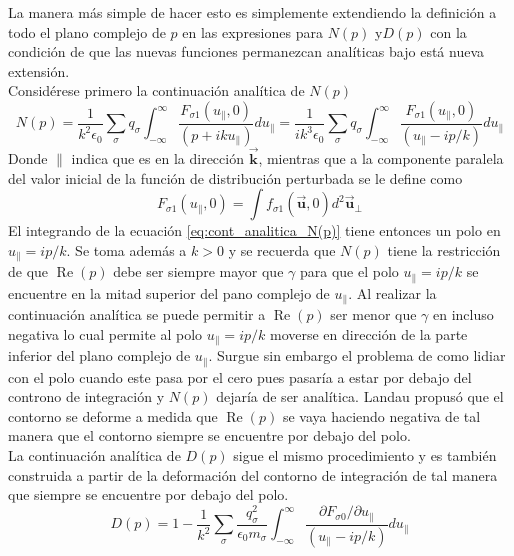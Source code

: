 \documentclass[../tesis_main_file.tex]{subfiles}
\begin{document}
La manera más simple de hacer esto es simplemente extendiendo la definición a todo el plano complejo de $p$ en las expresiones para $N(p)$ y$D(p)$ con la condición de que las nuevas funciones permanezcan analíticas bajo está nueva extensión.\\
Considérese primero la continuación analítica de $N(p)$
\begin{equation}
\label{eq:cont_analitica_N(p)}
N(p) = \frac{1}{k^2 \epsilon_0}\sum_{\sigma}q_{\sigma}\int ^{\infty}_{-\infty}\frac{F_{\sigma 1}(u_{\parallel},0)}{(p +iku_{\parallel})}du_{\parallel}=\frac{1}{ik^3 \epsilon_0}\sum_{\sigma}q_{\sigma}\int ^{\infty}_{-\infty}\frac{F_{\sigma 1}(u_{\parallel},0)}{(u_{\parallel} -ip/k)}du_{\parallel}
\end{equation}
Donde $\parallel$ indica que es en la dirección $\overrightarrow{\textbf{k}}$, mientras que a la componente paralela del valor inicial de la función de distribución perturbada se le define como
\begin{equation}
F_{\sigma 1}(u_{\parallel},0)=\int f_{\sigma 1}(\overrightarrow{\textbf{u}},0)d^2\overrightarrow{\textbf{u}}_{\perp}
\end{equation}
El integrando de la ecuación \ref{eq:cont_analitica_N(p)} tiene entonces un polo en $u_{\parallel}=ip/k$. Se toma además a $k>0$ y se recuerda que $N(p)$ tiene la restricción de que $\operatorname{Re}(p)$ debe ser siempre mayor que $\gamma$ para que el polo $u_{\parallel}=ip/k$ se encuentre en la mitad superior del pano complejo de $u_{\parallel}$. Al realizar la continuación analítica se puede permitir a $\operatorname{Re}(p)$ ser menor que $\gamma$ en incluso negativa lo cual permite al polo $u_{\parallel}=ip/k$ moverse en dirección de la parte inferior del plano complejo de $u_{\parallel}$. Surgue sin embargo el problema de como lidiar con el polo cuando este pasa por el cero pues pasaría a estar por debajo del controno de integración y $N(p)$ dejaría de ser analítica. Landau propusó que el contorno se deforme a medida que $\operatorname{Re}(p)$ se vaya haciendo negativa de tal manera que el contorno siempre se encuentre por debajo del polo.\cite{bellan2008fundamentals}\\
La continuación analítica de $D(p)$ sigue el mismo procedimiento y es también construida a partir de la deformación del contorno de integración de tal manera que siempre se encuentre por debajo del polo.\\
\begin{equation}
\label{eq:cont_analitica_D(p)}
D(p)=1-\frac{1}{k^2}\sum _{\sigma}\frac{q_{\sigma}^2}{\epsilon _0m_{\sigma}}\int ^{\infty}_{-\infty}\frac{\partial F_{\sigma 0}/\partial u_{\parallel}}{(u_{\parallel} -ip/k)}du_{\parallel}
\end{equation}
\end{document}
